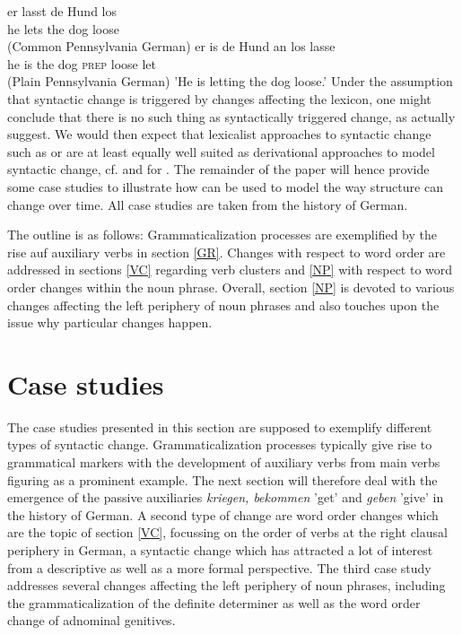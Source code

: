\documentclass[output=paper]{langsci/langscibook}
\begin{document}
\eal
\ex
\gll er lasst de Hund los \\ he lets the dog loose \\  \hfill (Common Pennsylvania German)
\ex
\gll er is de Hund an los lasse \\ he is the dog \textsc{prep} loose let \\  \hfill (Plain Pennsylvania German)
\glt 'He is letting the dog loose.'
\zl
Under the assumption that syntactic change is triggered by changes affecting the lexicon, one might conclude that there is no such thing as syntactically triggered change, as \cite{BiWa2015} actually suggest. We would then expect that lexicalist approaches to syntactic change such as \hpsg or \lfg are at least equally well suited as derivational approaches to model syntactic change, cf. \cite{vincent2001} and \cite{BoVi2017} for \lfg. The remainder of the paper will hence provide some case studies to illustrate how \hpsg can be used to model the way structure can change over time. All case studies are taken from the history of German.
 
The outline is as follows: Grammaticalization processes are exemplified by the rise auf auxiliary verbs in section \ref{GR}. Changes with respect to word order are addressed in sections \ref{VC} regarding verb clusters and \ref{NP} with respect to word order changes within the noun phrase. Overall, section \ref{NP} is devoted to various changes affecting the left periphery of noun phrases and also touches upon the issue why particular changes happen.  

\section{Case studies}

The case studies presented in this section are supposed to exemplify different types of syntactic change. Grammaticalization processes typically give rise to grammatical markers with the development of auxiliary verbs from main verbs figuring as a prominent example. The next section will therefore deal with the emergence of the passive auxiliaries \textit{kriegen, bekommen} 'get' and \textit{geben} 'give' in the history of German. A second type of change are word order changes which are the topic of section \ref{VC}, focussing on the order of verbs at the right clausal periphery in German, a syntactic change which has attracted a lot of interest from a descriptive as well as a more formal perspective. The third case study addresses several changes affecting the left periphery of noun phrases, including the grammaticalization of the definite determiner as well as the word order change of adnominal genitives. 
\end{document}
